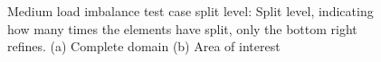 \begin{figure}[H]
	\centering
	\hfill
	\caption{Medium load imbalance test case split level: Split level, indicating how many times the elements have split, only the bottom right refines. (a) Complete domain (b) Area of interest}\label{fig:load_imbalance_case_medium_s}
\end{figure}

